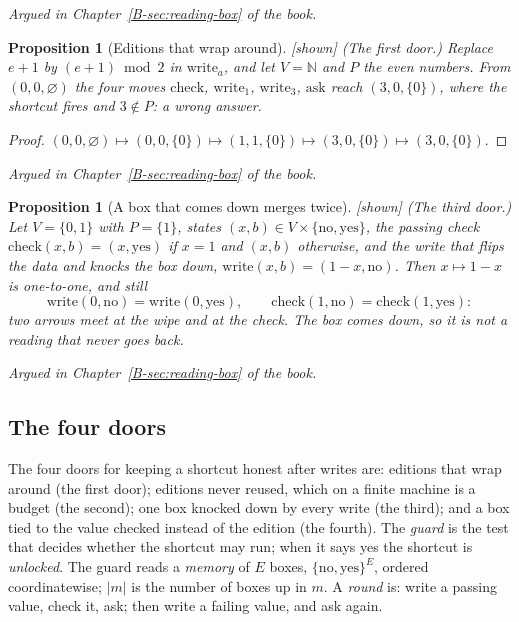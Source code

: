 \documentclass[11pt, a4paper]{article}
\theoremstyle{plain}
\newtheorem{proposition}[theorem]{Proposition}
\theoremstyle{definition}
\theoremstyle{remark}
\newcommand{\N}{\mathbb{N}}
\newcommand{\Bool}{\{\mathrm{no},\mathrm{yes}\}}
\newcommand{\argued}[1]{\par\noindent\textit{Argued in Chapter~\ref{B-#1} of the book.}\par}
\newcommand{\kind}[1]{\textup{[#1]}}
\begin{document}
\argued{sec:reading-box}

\begin{proposition}[Editions that wrap around]\label{spec:wrap} \kind{shown}
(The first door.) Replace $e+1$ by $(e+1)\bmod2$ in $\mathrm{write}_a$, and let $V=\N$ and $P$ the even
numbers. From $(0,0,\varnothing)$ the four moves $\mathrm{check}$, $\mathrm{write}_1$, $\mathrm{write}_3$,
$\mathrm{ask}$ reach $(3,0,\{0\})$, where the shortcut fires and $3\notin P$: a wrong answer.
\end{proposition}

\begin{proof}
$(0,0,\varnothing)\mapsto(0,0,\{0\})\mapsto(1,1,\{0\})\mapsto(3,0,\{0\})\mapsto(3,0,\{0\})$.
\end{proof}

\argued{sec:reading-box}

\begin{proposition}[A box that comes down merges twice]\label{spec:toggle-merges} \kind{shown}
(The third door.) Let $V=\{0,1\}$ with $P=\{1\}$, states $(x,b)\in V\times\Bool$, the passing check
$\mathrm{check}(x,b)=(x,\mathrm{yes})$ if $x=1$ and $(x,b)$ otherwise, and the write that flips the data and
knocks the box down, $\mathrm{write}(x,b)=(1-x,\mathrm{no})$. Then $x\mapsto1-x$ is one-to-one, and still
\[
\mathrm{write}(0,\mathrm{no})=\mathrm{write}(0,\mathrm{yes}),\qquad
\mathrm{check}(1,\mathrm{no})=\mathrm{check}(1,\mathrm{yes}):
\]
two arrows meet at the wipe and at the check. The box comes down, so it is not a reading that never goes back.
\end{proposition}

\argued{sec:reading-box}

\subsection*{The four doors}

The four doors for keeping a shortcut honest after writes are: editions that wrap around (the first door);
editions never reused, which on a finite machine is a budget (the second); one box knocked down by every write
(the third); and a box tied to the value checked instead of the edition (the fourth). The \emph{guard} is the
test that decides whether the shortcut may run; when it says yes the shortcut is \emph{unlocked}. The guard
reads a \emph{memory} of $E$ boxes, $\{\mathrm{no},\mathrm{yes}\}^E$, ordered
coordinatewise; $|m|$ is the number of boxes up in $m$. A \emph{round} is: write a passing value, check it,
ask; then write a failing value, and ask again.
\end{document}
